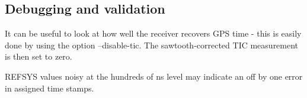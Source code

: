 \subsection{Debugging and validation}

It can be useful to look at how well the receiver recovers GPS time - this is easily done by
using the option --disable-tic. The sawtooth-corrected TIC measurement is then set to zero.

REFSYS values noisy at the hundreds of ns level may indicate an off by one error in assigned time stamps.

